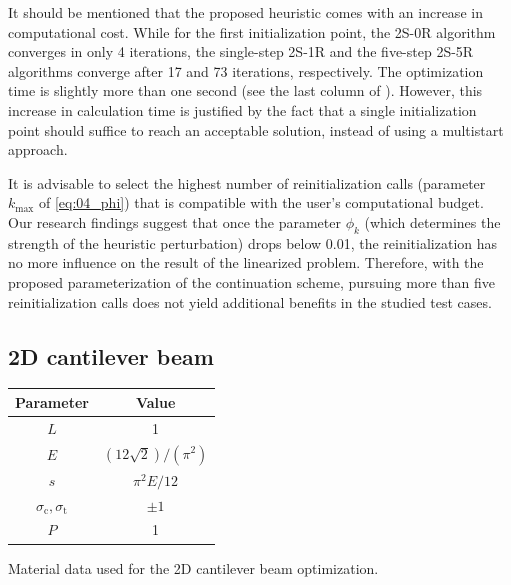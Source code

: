 It should be mentioned that the proposed heuristic comes with an increase in computational cost. While for the first initialization point, the 2S-0R algorithm converges in only 4 iterations, the single-step 2S-1R and the five-step 2S-5R algorithms converge after 17 and 73 iterations, respectively. The optimization time is slightly more than one second (see the last column of ). However, this increase in calculation time is justified by the fact that a single initialization point should suffice to reach an acceptable solution, instead of using a multistart approach.

It is advisable to select the highest number of reinitialization calls (parameter $k_{\text{max}}$ of \eqref{eq:04_phi}) that is compatible with the user's computational budget. Our research findings suggest that once the parameter $\phi_k$ (which determines the strength of the heuristic perturbation) drops below 0.01, the reinitialization has no more influence on the result of the linearized problem. Therefore, with the proposed parameterization of the continuation scheme, pursuing more than five reinitialization calls does not yield additional benefits in the studied test cases.

\subsection{2D cantilever beam}
\label{sec:04_2dcant}
\begin{margintable}
    \small
    \centering
    \begin{tabular}{cc}
    \toprule
    \textbf{Parameter}        & \textbf{Value} \\ \midrule
    $L$ & 1 \\
    $E$              & $(12\sqrt{2})/(\pi^2)$     \\
    $s$ & $\pi^2 E / 12$ \\
    $\sigma_\text{c}, \sigma_\text{t}$ & $\pm 1$ \\
    $P$              & 1   \\
    \bottomrule
    \end{tabular}
    \caption{Material data used for the 2D cantilever beam optimization.}
    \label{tab:04_2D_cand_mat}
\end{margintable}

